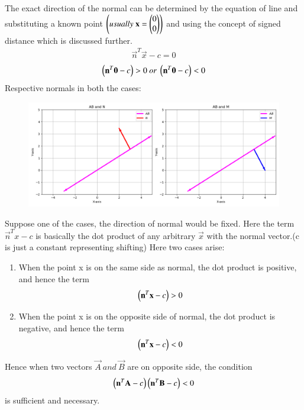 \documentclass[journal,12pt,onecolumn]{IEEEtran}
\begin{document}
The exact direction of the normal can be determined by the equation of line and substituting a known point $\left(usually \ \mathbf{x}=\begin{pmatrix}0 \\ 0\end{pmatrix}\right)$ and using the concept of signed distance which is discussed further.
\begin{align}
\vec{n}^T\vec{x}-c=0
\end{align}
\begin{align}
 \left(\mathbf{n}^T\mathbf{0}-c\right)>0 \ or \ \left(\mathbf{n}^T\mathbf{0}-c\right)<0 
\end{align}
Respective normals in both the cases:
\begin{figure}[H]
	\centering
	\includegraphics[scale=0.5]{normal}
	\caption{}
	\label{fig3}
\end{figure}
Suppose one of the cases, the direction of normal would be fixed. Here the term $\vec{n}^Tx-c$ is basically the dot product of any arbitrary $\vec{x}$ with the normal vector.(c is just a constant representing shifting) 
Here two cases arise:
\begin{enumerate}
\item When the point x is on the same side as normal, the dot product is positive, and hence the term $$\left(\mathbf{n}^T\mathbf{x}-c\right)>0$$ 
\item When the point x is on the opposite side of normal, the dot product is negative, and hence the term $$\left(\mathbf{n}^T\mathbf{x}-c\right)<0$$
\end{enumerate}
Hence when two vectors $\vec{A} \ and \ \vec{B}$ are on opposite side, the condition $$\left(\mathbf{n}^T\mathbf{A}-c\right)\left(\mathbf{n}^T\mathbf{B}-c\right)<0 $$ is sufficient and necessary.
\end{document}
